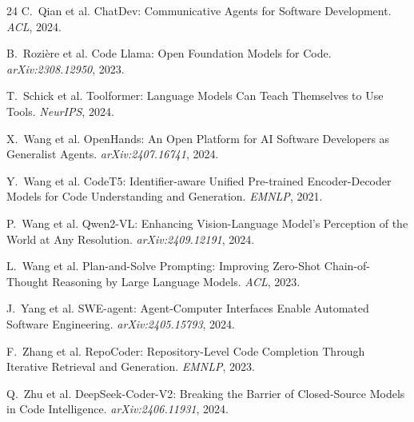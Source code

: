 \documentclass{article}
\begin{document}
\begin{thebibliography}{24}
C.~Qian et al.
\newblock ChatDev: Communicative Agents for Software Development.
\newblock \emph{ACL}, 2024.

B.~Rozi\`{e}re et al.
\newblock Code Llama: Open Foundation Models for Code.
\newblock \emph{arXiv:2308.12950}, 2023.

T.~Schick et al.
\newblock Toolformer: Language Models Can Teach Themselves to Use Tools.
\newblock \emph{NeurIPS}, 2024.

X.~Wang et al.
\newblock OpenHands: An Open Platform for AI Software Developers as Generalist Agents.
\newblock \emph{arXiv:2407.16741}, 2024.

Y.~Wang et al.
\newblock CodeT5: Identifier-aware Unified Pre-trained Encoder-Decoder Models for Code Understanding and Generation.
\newblock \emph{EMNLP}, 2021.

P.~Wang et al.
\newblock Qwen2-VL: Enhancing Vision-Language Model's Perception of the World at Any Resolution.
\newblock \emph{arXiv:2409.12191}, 2024.

L.~Wang et al.
\newblock Plan-and-Solve Prompting: Improving Zero-Shot Chain-of-Thought Reasoning by Large Language Models.
\newblock \emph{ACL}, 2023.

J.~Yang et al.
\newblock SWE-agent: Agent-Computer Interfaces Enable Automated Software Engineering.
\newblock \emph{arXiv:2405.15793}, 2024.

F.~Zhang et al.
\newblock RepoCoder: Repository-Level Code Completion Through Iterative Retrieval and Generation.
\newblock \emph{EMNLP}, 2023.

Q.~Zhu et al.
\newblock DeepSeek-Coder-V2: Breaking the Barrier of Closed-Source Models in Code Intelligence.
\newblock \emph{arXiv:2406.11931}, 2024.

\end{thebibliography}
\end{document}
